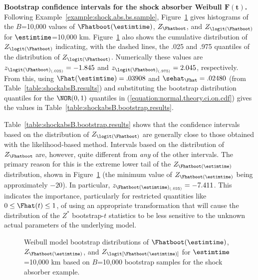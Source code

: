 \begin{example}
{\bf Bootstrap confidence intervals for the shock absorber Weibull
$\boldsymbol{F(t)}$.} Following Example~\ref{example:shock.abs.bs.sample},
Figure~\ref{figure:shockabsB.weib.boot.summary.fhat10k.ps}
gives histograms of the $B$=10,000 values of
$\Fhatboot(\estimtime)$, $Z_{\Fhatboot}$, and
$Z_{\logit(\Fhatboot)}$ for $\estimtime$=10,000 km.
Figure~\ref{figure:shockabsB.weib.boot.summary.fhat10k.ps} also shows
the cumulative distribution of $Z_{\logit(\Fhatboot)}$
indicating, with the dashed lines, the .025 and .975 quantiles of the
distribution of $Z_{\logit(\Fhatboot)}$.  Numerically these
values are $z_{\logit(\Fhatboot)_{(.025)}} = -1.845$ and
$z_{\logit(\Fhatboot)_{(.975)}}=2.045$, respectively.  From
this, using $\Fhat(\estimtime)=.03908$ and
$\sehat_{\Fhat}=.02480$ (from
Table~\ref{table:shockabsB.results}) and substituting the bootstrap
distribution quantiles for the $\NOR(0,1)$ quantiles in
(\ref{equation:normal.theory.ci.on.cdf}) gives the values in
Table~\ref{table:shockabsB.bootstrap.results}.

Table~\ref{table:shockabsB.bootstrap.results} shows
that the confidence intervals based on the distribution of
$Z_{\logit(\Fhatboot)}$ are generally close to those obtained with
the likelihood-based method. Intervals based on the distribution
of $Z_{\Fhatboot}$ are, however, quite different from {\em any} of the
other intervals. The primary reason for this is the extreme lower
tail of the $Z_{\Fhatboot(\estimtime)}$ distribution, shown in
Figure~\ref{figure:shockabsB.weib.boot.summary.fhat10k.ps} (the
minimum value of $Z_{\Fhatboot(\estimtime)}$ being approximately
$-20$).  In particular, $z_{\Fhatboot(\estimtime)_{(.025)}}
=-7.411$. This indicates the importance, particularly for
restricted quantities like $0 \leq \Fhat(t) \leq 1$, of using an
appropriate transformation that will cause the distribution of the
$Z^{*}$ bootstrap-$t$ statistics to be less sensitive to the unknown
actual parameters of the underlying model.
\begin{figure}
\caption{Weibull model bootstrap distributions of $\Fhatboot(\estimtime)$,
$Z_{\Fhatboot(\estimtime)}$, and $Z_{\logit[\Fhatboot(\estimtime)]}$
for $\estimtime$=10,000 km based on $B$=10,000 bootstrap samples for
the shock absorber example.}
\label{figure:shockabsB.weib.boot.summary.fhat10k.ps}
\end{figure}
\end{example}

